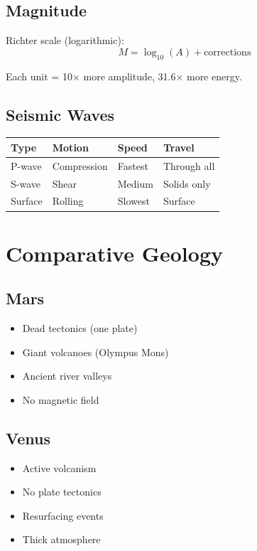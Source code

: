 \documentclass[
  11pt,
  letterpaper,
  twoside,
  openright]{book}
\providecommand{\tightlist}{%
  \setlength{\itemsep}{0pt}\setlength{\parskip}{0pt}}
\begin{document}
\subsection{Magnitude}\label{magnitude}

Richter scale (logarithmic): \[
M = \log_{10}(A) + \text{corrections}
\]

Each unit = 10× more amplitude, 31.6× more energy.

\subsection{Seismic Waves}\label{seismic-waves}

\begin{longtable}[]{@{}llll@{}}
\toprule\noalign{}
Type & Motion & Speed & Travel \\
\midrule\noalign{}
\endhead
\bottomrule\noalign{}
\endlastfoot
P-wave & Compression & Fastest & Through all \\
S-wave & Shear & Medium & Solids only \\
Surface & Rolling & Slowest & Surface \\
\end{longtable}

\section{Comparative Geology}\label{comparative-geology}

\subsection{Mars}\label{mars-1}

\begin{itemize}
\tightlist
\item
  Dead tectonics (one plate)
\item
  Giant volcanoes (Olympus Mons)
\item
  Ancient river valleys
\item
  No magnetic field
\end{itemize}

\subsection{Venus}\label{venus-1}

\begin{itemize}
\tightlist
\item
  Active volcanism
\item
  No plate tectonics
\item
  Resurfacing events
\item
  Thick atmosphere
\end{itemize}
\end{document}
